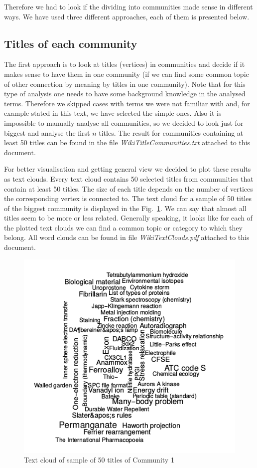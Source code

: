 \documentclass[paper=a4, fontsize=11pt]{scrartcl} %
\begin{document}
Therefore we had to look if the dividing into communities made sense in different ways. We have used three different approaches, each of them is presented below.

\subsection{Titles of each community}
The first approach is to look at titles (vertices) in communities and decide if it makes sense to have them in one community (if we can find some common topic of other connection by meaning by titles in one community). Note that for this type of analysis one needs to have some background knowledge in the analysed terms. Therefore we skipped cases with terms we were not familiar with and, for example stated in this text, we have selected the simple ones. Also it is impossible to manually analyse all communities, so we decided to look just for biggest and analyse the first $n$ titles. The result for communities containing at least 50 titles can be found in the file \textit{WikiTitleCommunities.txt} attached to this document. 

For better visualisation and getting general view we decided to plot these results as text clouds. Every text cloud contains 50 selected titles from communities that contain at least 50 titles. The size of each title depends on the number of vertices the corresponding vertex is connected to. The text cloud for a sample of 50 titles of the biggest community is displayed in the Fig.~\ref{TextCloud1}. We can say that almost all titles seem to be more or less related. Generally speaking, it looks like for each of the plotted text clouds we can find a common topic or category to which they belong. All word clouds can be found in file \textit{WikiTextClouds.pdf} attached to this document.

\begin{figure}[H]
	\centering
	\includegraphics[scale=0.75,keepaspectratio]{TextCloud1}
	\caption{Text cloud of sample of 50 titles of Community 1}
	\label{TextCloud1}
\end{figure}
\end{document}
